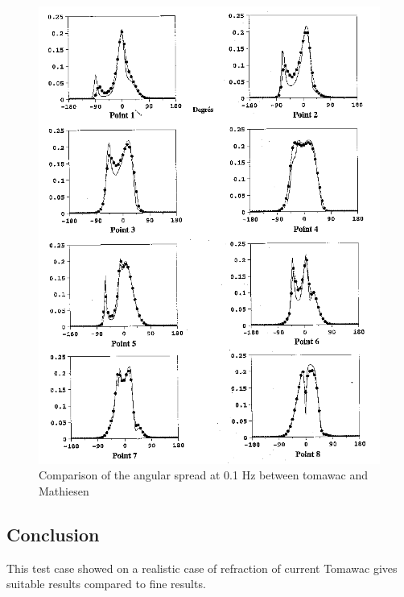\begin{figure} [!h]
\centering
\includegraphics[scale=0.55]{repartangulaire.png}
 \caption{Comparison of the angular spread at 0.1 Hz between tomawac and Mathiesen}
\label{repartang}
\end{figure}


\subsection{Conclusion}
This test case showed on a realistic case of refraction of current Tomawac
gives suitable results compared to fine results.
